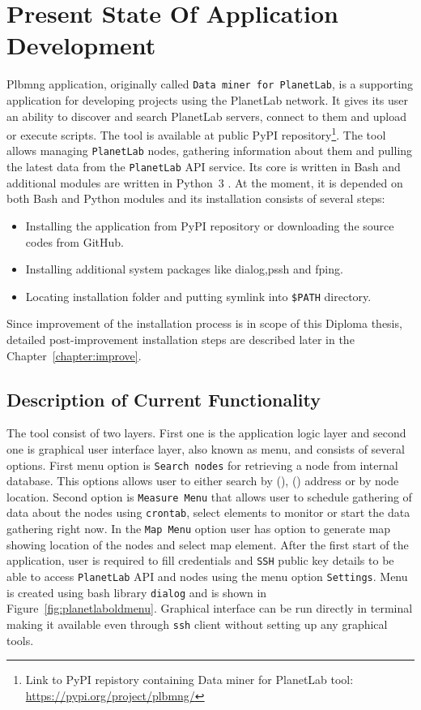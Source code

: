 \chapter{Present State Of Application Development}
\label{chapter:plbmng}
Plbmng application, originally called \texttt{Data miner for PlanetLab}, is a supporting application for developing projects using the PlanetLab network. It gives its user an ability to discover and search PlanetLab servers, connect to them and upload or execute scripts. The tool is available at public PyPI repository\footnote{Link to PyPI repistory containing Data miner for PlanetLab tool: \url{https://pypi.org/project/plbmng/}}. The tool allows managing \texttt{PlanetLab} nodes, gathering information about them and pulling the latest data from the \texttt{PlanetLab} API service. Its core is written in Bash and additional modules are written in Python~3 \cite{suba1}. At the moment, it is depended on both Bash and Python modules and its installation consists of several steps:
\begin{itemize}
	\item Installing the application from PyPI repository or downloading the source codes from GitHub.
	\item Installing additional system packages like dialog,pssh and fping.
	\item Locating installation folder and putting symlink into \texttt{\$PATH} directory.
\end{itemize}
Since improvement of the installation process is in scope of this Diploma thesis, detailed post-improvement installation steps are described later in the Chapter~\ref{chapter:improve}.
\section{Description of Current Functionality}
The tool consist of two layers. First one is the application logic layer and second one is graphical user interface layer, also known as menu, and consists of several options. First menu option is \texttt{Search nodes} for retrieving a node from internal database. This options allows user to either search by  (),  () address or by node location. Second option is \texttt{Measure Menu} that allows user to schedule gathering of data about the nodes using \texttt{crontab}, select elements to monitor or start the data gathering right now. In the \texttt{Map Menu} option user has option to generate map showing location of the nodes and select map element. After the first start of the application, user is required to fill credentials and \texttt{SSH} public key details to be able to access \texttt{PlanetLab} API and nodes using the menu option \texttt{Settings}. Menu is created using bash library \texttt{dialog} and is shown in Figure~\ref{fig:planetlaboldmenu}. Graphical interface can be run directly in terminal making it available even through \texttt{ssh} client without setting up any graphical tools.

